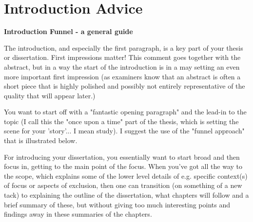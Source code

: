

\section{Introduction Advice}


\textbf{Introduction Funnel - a general guide}

The introduction, and especially the first paragraph, is a key part of your thesis or dissertation.  First impressions matter! This comment goes together with the abstract, but in a way the start of the introduction is in a may setting an even more important first impression (as examiners know that an abstract is often a short piece that is highly polished and possibly not entirely representative of the quality that will appear later.)

You want to start off with a "fantastic opening paragraph" and the lead-in to the topic (I call this the "once upon a time" part of the thesis, which is setting the scene for your 'story'... I mean study). I suggest the use of the "funnel approach" that is illustrated below. 

For introducing your dissertation, you essentially want to start broad and then focus in, getting to the main point of the focus. When you've got all the way to the scope, which explains some of the lower level details of e.g. specific context(s) of focus or aspects of exclusion, then one can transition (on something of a new tack) to explaining the outline of the dissertation, what chapters will follow and a brief summary of these, but without giving too much interesting points and findings away in these summaries of the chapters. 



